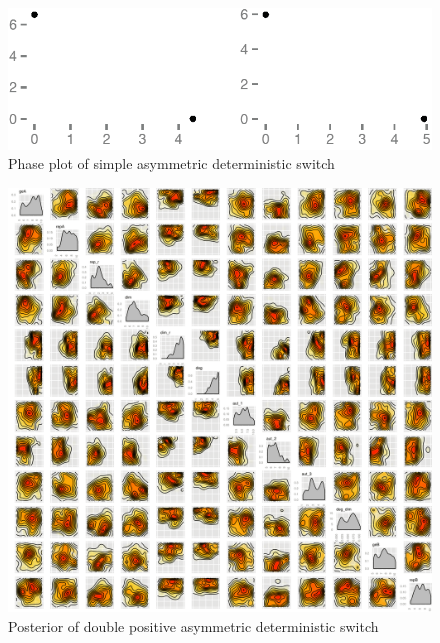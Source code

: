 \begin{figure}[htbp]
\begin{center}
\includegraphics[scale=0.15]{chapterStabilityFinder/mass_action_switches/deterministic/asym/cl_det_phase.png}
\caption{Phase plot of simple asymmetric deterministic switch}\label{fig:asym_det_cl_ma_phase}
\end{center}
\end{figure}

\begin{figure}[htbp]
\begin{center}
\includegraphics[scale=0.1]{chapterStabilityFinder/mass_action_switches/deterministic/asym/posterior_dp.png}
\caption{Posterior of double positive asymmetric deterministic switch}\label{fig:asym_det_dp_ma_post}
\end{center}
\end{figure}

